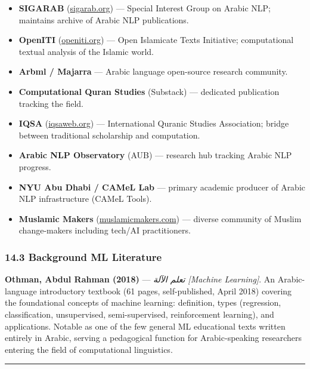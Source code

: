 \documentclass[12pt,a4paper]{article}
\providecommand{\tightlist}{\setlength{\itemsep}{0pt}\setlength{\parskip}{0pt}}
\begin{document}
\begin{itemize}
\tightlist
\item
  \textbf{SIGARAB} (\href{https://sigarab.org}{sigarab.org}) --- Special
  Interest Group on Arabic NLP; maintains archive of Arabic NLP
  publications.
\item
  \textbf{OpenITI} (\href{https://openiti.org}{openiti.org}) --- Open
  Islamicate Texts Initiative; computational textual analysis of the
  Islamic world.
\item
  \textbf{Arbml / Majarra} --- Arabic language open-source research
  community.
\item
  \textbf{Computational Quran Studies} (Substack) --- dedicated
  publication tracking the field.
\item
  \textbf{IQSA} (\href{https://iqsaweb.org}{iqsaweb.org}) ---
  International Qur\textquotesingle anic Studies Association; bridge
  between traditional scholarship and computation.
\item
  \textbf{Arabic NLP Observatory} (AUB) --- research hub tracking Arabic
  NLP progress.
\item
  \textbf{NYU Abu Dhabi / CAMeL Lab} --- primary academic producer of
  Arabic NLP infrastructure (CAMeL Tools).
\item
  \textbf{Muslamic Makers}
  (\href{https://muslamicmakers.com}{muslamicmakers.com}) --- diverse
  community of Muslim change-makers including tech/AI practitioners.
\end{itemize}

\subsubsection{14.3 Background ML
Literature}\label{background-ml-literature}

\textbf{Othman, Abdul Rahman (2018)} --- \emph{تعلم الآلة {[}Machine
Learning{]}}. An Arabic-language introductory textbook (61 pages,
self-published, April 2018) covering the foundational concepts of
machine learning: definition, types (regression, classification,
unsupervised, semi-supervised, reinforcement learning), and
applications. Notable as one of the few general ML educational texts
written entirely in Arabic, serving a pedagogical function for
Arabic-speaking researchers entering the field of computational
linguistics.

\begin{center}\rule{0.5\linewidth}{0.5pt}\end{center}

\protect{}\label{s15}
\end{document}
